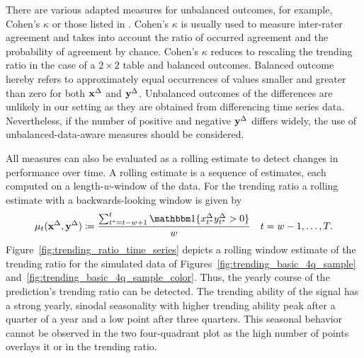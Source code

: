 There are various adapted measures for unbalanced outcomes, for example, Cohen's $\kappa$ \parencite{Cohen1960} or those listed in \textcite[Table 3.3]{Jolliffe2012}.
Cohen's $\kappa$ is usually used to measure inter-rater agreement and takes into account the ratio of occurred agreement and the probability of agreement by chance.
Cohen's $\kappa$ reduces to rescaling the trending ratio in the case of a $2\times2$ table and balanced outcomes.
Balanced outcome hereby refers to approximately equal occurrences of values smaller and greater than zero for both $\mathbf{x}^{\Delta}$ and $\mathbf{y}^{\Delta}$.
Unbalanced outcomes of the differences are unlikely in our setting as they are obtained from differencing time series data.
Nevertheless, if the number of positive and negative $\mathbf{y}^{\Delta}$ differs widely, the use of unbalanced-data-aware measures should be considered.

All measures can also be evaluated as a rolling estimate to detect changes in performance over time.
A rolling estimate is a sequence of estimates, each computed on a length-$w$-window of the data.
For the trending ratio a rolling estimate with a backwards-looking window is given by
\begin{equation*}
    \acc_t (\diffx, \diffy) \coloneqq \frac{\sum_{t^* = t-w + 1}^{t} \ind{\diffxt[t^*] \diffyt[t^*] > 0}}{w} \quad t = w-1, \dots, T.\label{eq:acc_rolling}
\end{equation*}
Figure~\ref{fig:trending_ratio_time_series} depicts a rolling window estimate of the trending ratio for the simulated data of Figures~\ref{fig:trending_basic_4q_sample} and~\ref{fig:trending_basic_4q_sample_color}.
Thus, the yearly course of the prediction's trending ratio can be detected.
The trending ability of the signal has a strong yearly, sinodal seasonality with higher trending ability peak after a quarter of a year and a low point after three quarters.
This seasonal behavior cannot be observed in the two four-quadrant plot as the high number of points overlays it or in the trending ratio.

